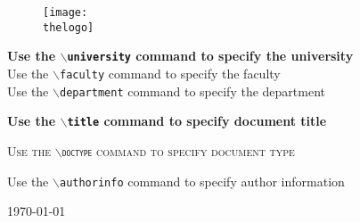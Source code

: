 \begin{titlepage}
\providecommand{\thetitle}{Use the \texttt{$\backslash$title} command to specify document title}
\providecommand{\thedoctype}{Use the \texttt{$\backslash$doctype} command to specify document type}
\providecommand{\theuniversity}{Use the \texttt{$\backslash$university} command to specify the university}
\providecommand{\thefaculty}{Use the \texttt{$\backslash$faculty} command to specify the faculty}
\providecommand{\thedepartment}{Use the \texttt{$\backslash$department} command to specify the department}
\providecommand{\thedate}{\today}
\providecommand{\thelogo}{bmelogo.eps}
\providecommand{\theauthorinfo}{Use the \texttt{$\backslash$authorinfo} command to specify author information}

\begin{figure}[t]
\centering
\texttt{[image: \\thelogo]}
\end{figure}

\begin{center}
\textbf{\theuniversity}\\
\textmd{\thefaculty}\\
\textmd{\thedepartment}
\vspace{3 cm}
\begin{center}
\Huge \bfseries \thetitle
\end{center}

\vspace{2 cm} %

\textsc{\Large{\thedoctype}}

\vspace{3.5 cm}

\begin{center}
\theauthorinfo
\end{center}

\vfill
\thedate
\end{center}
\end{titlepage}